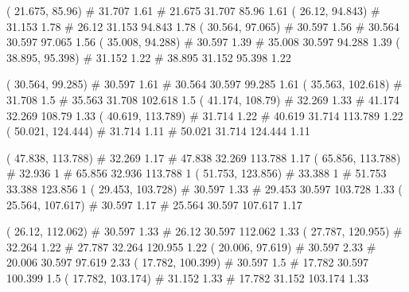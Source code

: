 \documentclass[a4paper,openbib,10pt]{article}
\newenvironment{treegraph}{\begin{graph}}{\end{graph}}
\begin{document}
\begin{treegraph}
  ( 21.675, 85.96) #     31.707    1.61
   #    21.675    31.707    85.96    1.61
  ( 26.12, 94.843) #     31.153    1.78
   #    26.12    31.153    94.843    1.78
  ( 30.564, 97.065) #     30.597    1.56
   #    30.564    30.597    97.065    1.56
  ( 35.008, 94.288) #     30.597    1.39
   #    35.008    30.597    94.288    1.39
  ( 38.895, 95.398) #     31.152    1.22
   #    38.895    31.152    95.398    1.22

  ( 30.564, 99.285) #     30.597    1.61
   #    30.564    30.597    99.285    1.61
  ( 35.563, 102.618) #     31.708    1.5
   #    35.563    31.708    102.618    1.5
  ( 41.174, 108.79) #     32.269    1.33
   #    41.174    32.269    108.79    1.33
  ( 40.619, 113.789) #     31.714    1.22
   #    40.619    31.714    113.789    1.22
  ( 50.021, 124.444) #     31.714    1.11
   #    50.021    31.714    124.444    1.11

  ( 47.838, 113.788) #     32.269    1.17
   #    47.838    32.269    113.788    1.17
  ( 65.856, 113.788) #     32.936    1
   #    65.856    32.936    113.788    1
  ( 51.753, 123.856) #     33.388    1
   #    51.753    33.388    123.856    1
  ( 29.453, 103.728) #     30.597    1.33
   #    29.453    30.597    103.728    1.33
  ( 25.564, 107.617) #     30.597    1.17
   #    25.564    30.597    107.617    1.17

  ( 26.12, 112.062) #     30.597    1.33
   #    26.12    30.597    112.062    1.33
  ( 27.787, 120.955) #     32.264    1.22
   #    27.787    32.264    120.955    1.22
  ( 20.006, 97.619) #     30.597    2.33
   #    20.006    30.597    97.619    2.33
  ( 17.782, 100.399) #     30.597    1.5
   #    17.782    30.597    100.399    1.5
  ( 17.782, 103.174) #     31.152    1.33
   #    17.782    31.152    103.174    1.33


\end{treegraph}
\end{document}

